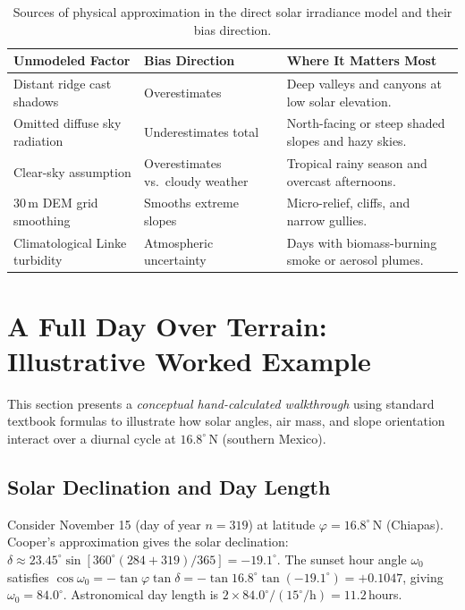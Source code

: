 \documentclass[11pt,a4paper]{article}
\begin{document}
\begin{table}[htbp]
\centering\small
\begin{tabularx}{\linewidth}{p{.28\linewidth}p{.18\linewidth}X}
\toprule
\textbf{Unmodeled Factor} & \textbf{Bias Direction} & \textbf{Where It Matters Most}\\\midrule
Distant ridge cast shadows & Overestimates & Deep valleys and canyons at low solar elevation.\\
Omitted diffuse sky radiation & Underestimates total & North-facing or steep shaded slopes and hazy skies.\\
Clear-sky assumption & Overestimates vs.\ cloudy weather & Tropical rainy season and overcast afternoons.\\
30\,m DEM grid smoothing & Smooths extreme slopes & Micro-relief, cliffs, and narrow gullies.\\
Climatological Linke turbidity & Atmospheric uncertainty & Days with biomass-burning smoke or aerosol plumes.\\\bottomrule
\end{tabularx}
\caption{Sources of physical approximation in the direct solar irradiance model and their bias direction.}
\label{tab:errores-solar}
\end{table}


\section{A Full Day Over Terrain: Illustrative Worked Example}
\label{sec:solar-dia}

\begin{atencion}
This section presents a \emph{conceptual hand-calculated walkthrough} using standard textbook formulas to illustrate how solar angles, air mass, and slope orientation interact over a diurnal cycle at $16.8^\circ$\,N (southern Mexico).
\end{atencion}

\subsection{Solar Declination and Day Length}

Consider November 15 (day of year $n=319$) at latitude $\varphi = 16.8^\circ$\,N (Chiapas). Cooper's approximation gives the solar declination:
$\delta\approx23.45^\circ\sin[360^\circ(284+319)/365]=-19.1^\circ$.
The sunset hour angle $\omega_0$ satisfies $\cos\omega_0=-\tan\varphi\tan\delta=-\tan16.8^\circ\tan(-19.1^\circ)=+0.1047$, giving $\omega_0=84.0^\circ$. Astronomical day length is $2\times84.0^\circ/(15^\circ/\mathrm{h})=11.2$\,hours.
\end{document}
